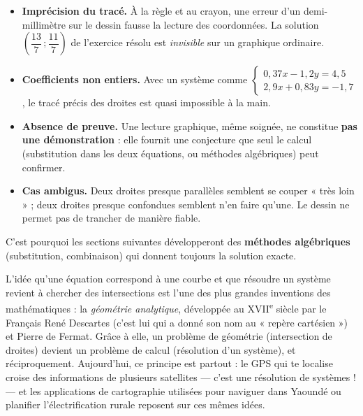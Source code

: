 \documentclass[11pt]{article}
\begin{document}
\begin{attention}
\begin{itemize}
\item \textbf{Imprécision du tracé.} À la règle et au crayon, une erreur d'un demi-millimètre sur le dessin fausse la lecture des coordonnées. La solution $\left(\dfrac{13}{7}\,;\dfrac{11}{7}\right)$ de l'exercice résolu est \emph{invisible} sur un graphique ordinaire.
\item \textbf{Coefficients non entiers.} Avec un système comme $\begin{cases} 0,37x - 1,2y = 4,5 \\ 2,9x + 0,83y = -1,7 \end{cases}$, le tracé précis des droites est quasi impossible à la main.
\item \textbf{Absence de preuve.} Une lecture graphique, même soignée, ne constitue \textbf{pas une démonstration} : elle fournit une conjecture que seul le calcul (substitution dans les deux équations, ou méthodes algébriques) peut confirmer.
\item \textbf{Cas ambigus.} Deux droites presque parallèles semblent se couper « très loin » ; deux droites presque confondues semblent n'en faire qu'une. Le dessin ne permet pas de trancher de manière fiable.
\end{itemize}
C'est pourquoi les sections suivantes développeront des \textbf{méthodes algébriques} (substitution, combinaison) qui donnent toujours la solution exacte.
\end{attention}

\begin{savaistu}
L'idée qu'une équation correspond à une courbe et que résoudre un système revient à chercher des intersections est l'une des plus grandes inventions des mathématiques : la \emph{géométrie analytique}, développée au XVII\textsuperscript{e} siècle par le Français René Descartes (c'est lui qui a donné son nom au « repère cartésien ») et Pierre de Fermat. Grâce à elle, un problème de géométrie (intersection de droites) devient un problème de calcul (résolution d'un système), et réciproquement. Aujourd'hui, ce principe est partout : le GPS qui te localise croise des informations de plusieurs satellites — c'est une résolution de systèmes ! — et les applications de cartographie utilisées pour naviguer dans Yaoundé ou planifier l'électrification rurale reposent sur ces mêmes idées.
\end{savaistu}
\end{document}
